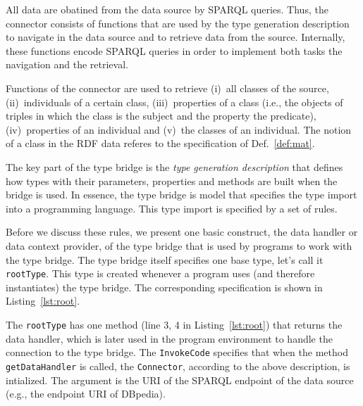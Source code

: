\documentclass{llncs} %
\newcommand{\ggr}[1]{} %
\begin{document}
All data are obatined from the data source by SPARQL queries.
Thus, the connector consists of functions that are used by the type generation description
to navigate in the data source and to retrieve data from the source.
Internally, these functions encode SPARQL queries in order to implement both tasks the navigation and the retrieval.

Functions of the connector are used to retrieve (i)~all classes of the source,
(ii)~individuals of a certain class, (iii)~properties of a class (i.e., the objects of
triples in which the class is the subject and the property the predicate),
(iv)~properties of an individual and (v)~the classes of an individual.
The notion of a class in the RDF data referes to the specification of Def.~\ref{def:mat}.


%
%
%



The key part of the type bridge is the \emph{type generation description} that
defines how types with their parameters, properties and methods are built when the bridge is used.
In essence, the type bridge is model that specifies the type import into a programming language.
This type import is specified by a set of rules. 

Before we discuss these rules, we present one basic construct, the data handler or data context provider,
 of the type bridge that is  used by programs to work with the type bridge.
The type bridge itself specifies one base type, let's call it \texttt{rootType}. This type
is created whenever a program uses (and therefore instantiates) the type bridge.
The corresponding specification is shown in Listing~\ref{lst:root}.

The \texttt{rootType} has one method (line 3, 4 in Listing~\ref{lst:root}) that
returns the data handler, which is later used in the program environment to handle the
connection to the type bridge. The \texttt{InvokeCode} specifies that when the method \texttt{getDataHandler}
is called, the \texttt{Connector}, according to the above description, is intialized. The argument is the URI
of the SPARQL endpoint of the data source (e.g., the endpoint URI of DBpedia). 
\end{document}

